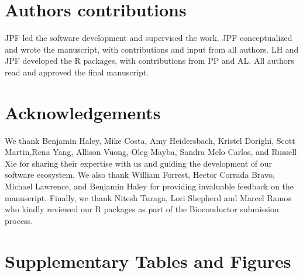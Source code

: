 \documentclass[pdftex,english,10pt]{article}
\begin{document}
{\section*{Authors contributions}

JPF led the software development and supervised the work.
JPF conceptualized and wrote the manuscript, with contributions and input from all authors. 
LH and JPF developed the R packages, with contributions from PP and AL. 
All authors read and approved the final manuscript.

\section*{Acknowledgements}

We thank Benjamin Haley, Mike Costa, Amy Heidersbach, Kristel Dorighi, Scott Martin,Rena Yang, Allison Vuong, Oleg Mayba, Sandra Melo Carlos, and Russell Xie for sharing their expertise with us and guiding the development of our software ecosystem. We also thank William Forrest, Hector Corrada Bravo, Michael Lawrence, and Benjamin Haley for providing invaluable feedback on the manuscript. Finally, we thank Nitesh Turaga, Lori Shepherd and Marcel Ramos who kindly reviewed our R packages as part of the Bioconductor submission process.








\clearpage
\section*{Supplementary Tables and Figures}

\renewcommand{\figurename}{Supplementary Figure}
\setcounter{figure}{0}
\makeatletter 
\renewcommand{\thefigure}{S\@arabic\c@figure}
\makeatother


\renewcommand{\tablename}{Supplementary Table}
\setcounter{table}{0}
\makeatletter 
\renewcommand{\thetable}{S\@arabic\c@table}
\makeatother




}
\end{document}
